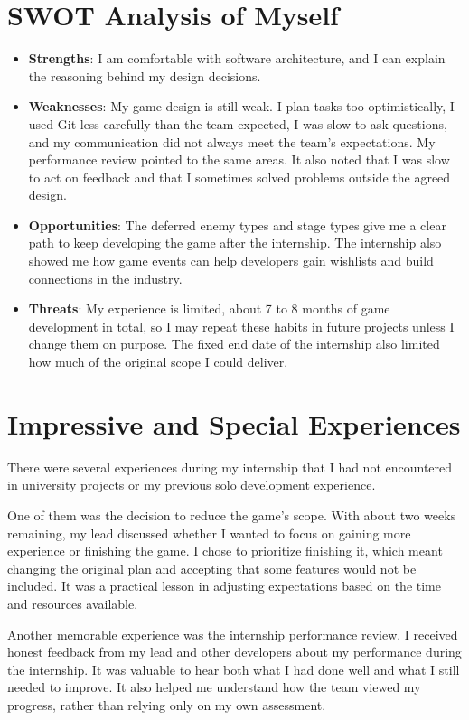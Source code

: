 \section{SWOT Analysis of Myself}
\begin{itemize}[label=-]
    \item \textbf{Strengths}: I am comfortable with software architecture, and I can explain the reasoning behind my design decisions.
    \item \textbf{Weaknesses}: My game design is still weak. I plan tasks too optimistically, I used Git less carefully than the team expected, I was slow to ask questions, and my communication did not always meet the team's expectations. My performance review pointed to the same areas. It also noted that I was slow to act on feedback and that I sometimes solved problems outside the agreed design.
    \item \textbf{Opportunities}: The deferred enemy types and stage types give me a clear path to keep developing the game after the internship. The internship also showed me how game events can help developers gain wishlists and build connections in the industry.
    \item \textbf{Threats}: My experience is limited, about 7 to 8 months of game development in total, so I may repeat these habits in future projects unless I change them on purpose. The fixed end date of the internship also limited how much of the original scope I could deliver.
\end{itemize}

\pagebreak
\section{Impressive and Special Experiences}

There were several experiences during my internship that I had not encountered in university projects or my previous solo development experience.

One of them was the decision to reduce the game's scope. With about two weeks remaining, my lead discussed whether I wanted to focus on gaining more experience or finishing the game. I chose to prioritize finishing it, which meant changing the original plan and accepting that some features would not be included. It was a practical lesson in adjusting expectations based on the time and resources available.

Another memorable experience was the internship performance review. I received honest feedback from my lead and other developers about my performance during the internship. It was valuable to hear both what I had done well and what I still needed to improve. It also helped me understand how the team viewed my progress, rather than relying only on my own assessment.

